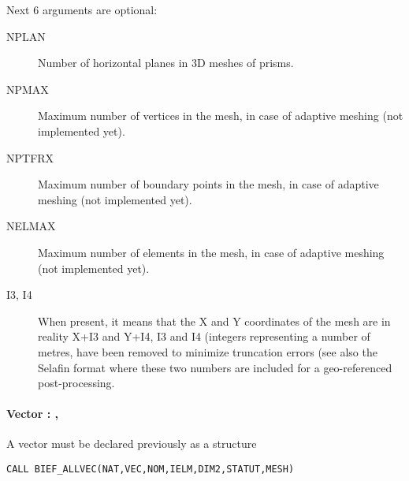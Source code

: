 Next 6 arguments are optional:
\begin{description}
\item [NPLAN] Number of horizontal planes in 3D meshes of prisms.
\item [NPMAX] Maximum number of vertices in the mesh, in case of adaptive
  meshing (not implemented yet).
\item [NPTFRX] Maximum number of boundary points in the mesh, in case of
  adaptive meshing (not implemented yet).
\item [NELMAX] Maximum number of elements in the mesh, in case of adaptive
  meshing (not implemented yet).
\item [I3, I4] When present, it means that the X and Y coordinates of the mesh
  are in reality X+I3 and Y+I4, I3 and I4 (integers representing a number of
  metres, have been removed to minimize truncation errors (see also the Selafin
  format where these two numbers are included for a geo-referenced
  post-processing.
\end{description}

\paragraph{Vector :  , }

A vector must be declared previously as a  structure

\begin{lstlisting}[language=TelFortran]
CALL BIEF_ALLVEC(NAT,VEC,NOM,IELM,DIM2,STATUT,MESH)
\end{lstlisting}

